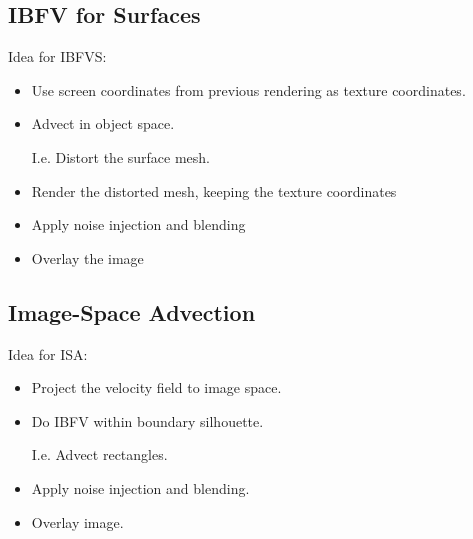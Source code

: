 \subsection{IBFV for Surfaces}
Idea for IBFVS:
\begin{itemize}
    \item Use screen coordinates from previous rendering as texture coordinates.
    \item Advect in object space.
    
    I.e. Distort the surface mesh.
    \item Render the distorted mesh, keeping the texture coordinates
    \item Apply noise injection and blending
    \item Overlay the image
\end{itemize}

\subsection{Image-Space Advection}
Idea for ISA:
\begin{itemize}
    \item Project the velocity field to image space.
    \item Do IBFV within boundary silhouette.
    
    I.e. Advect rectangles.
    
    \item Apply noise injection and blending.
    \item Overlay image.
\end{itemize}

